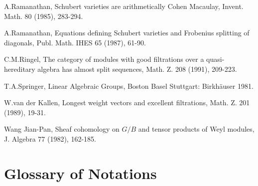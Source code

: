 \begin{thebibliography}{}
 A.\@ Ramanathan, Schubert varieties are arithmetically
  Cohen Macaulay, Invent. Math. 80 (1985), 283-294.

 A.\@ Ramanathan, Equations defining Schubert varieties
  and Frobenius splitting of diagonals, Publ. Math. IHES 65 (1987), 61-90.

 C.M.\@ Ringel, The category of modules with good
  filtrations over a quasi-hereditary algebra has almost split
  sequences, Math. Z. 208 (1991), 209-223.

 T.A.\@ Springer, Linear Algebraic Groups, Boston Basel
  Stuttgart: Birkh\"auser 1981. 

 W.\@ van der Kallen, Longest weight vectors and
  excellent filtrations, Math. Z. 201 (1989), 19-31.

 Wang Jian-Pan, Sheaf cohomology on $G/B$ and tensor
  products of Weyl modules, J. Algebra 77 (1982), 162-185.

\end{thebibliography}

\newpage





\thispagestyle{plain}
\section{Glossary of Notations}\pageoriginale


